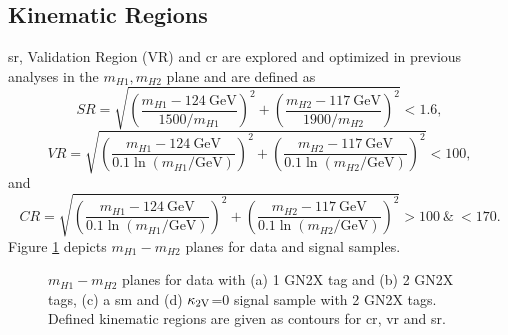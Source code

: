 \subsection{Kinematic Regions}\label{sec:kinematic_regions}
\ac{sr}, Validation Region (VR) and \ac{cr} are explored and optimized in previous analyses \citep{aad2023search,ATL-COM-PHYS-2023-033} in the $m_{H1},m_{H2}$ plane and are defined as
\begin{equation}
    SR =  \sqrt{\left(\frac{m_{H1} - \SI{124}{\GeV}}{1500 / m_{H1}}\right)^{2} + \left(\frac{m_{H2} - \SI{117}{\GeV}}{1900 / m_{H2}}\right)^{2}} < 1.6,
\end{equation}
\begin{equation}
    \label{VR_Xhh}
    VR =  \sqrt{\left(\frac{m_{H1} - \SI{124}{\GeV}}{0.1 \ln(m_{H1}/\text{GeV})}\right)^{2} + \left(\frac{m_{H2} - \SI{117}{\GeV}}{0.1 \ln(m_{H2}/\text{GeV})}\right)^{2}} < 100,
\end{equation}
and
\begin{equation}
    \label{CR_Xhh}
    CR = \sqrt{\left(\frac{m_{H1} - \SI{124}{\GeV}}{0.1 \ln(m_{H1}/\text{GeV})}\right)^{2} + \left(\frac{m_{H2} - \SI{117}{\GeV}}{0.1 \ln(m_{H2}/\text{GeV})}\right)^{2}} > 100  \ \& \ < 170.
\end{equation}
Figure \ref{fig:m_hh_plane} depicts $m_{H1}-m_{H2}$ planes for data and signal samples.
\begin{figure}
    \centering
    \caption[]{ $m_{H1}-m_{H2}$ planes for data with (a) 1 GN2X tag and (b) 2 GN2X tags, (c) a \ac{sm} and (d) $\kappa_{\text{2V}}$=0 signal sample with 2 GN2X tags. Defined kinematic regions are given as contours for \ac{cr}, \ac{vr} and \ac{sr}.}
    \label{fig:m_hh_plane}
\end{figure}

